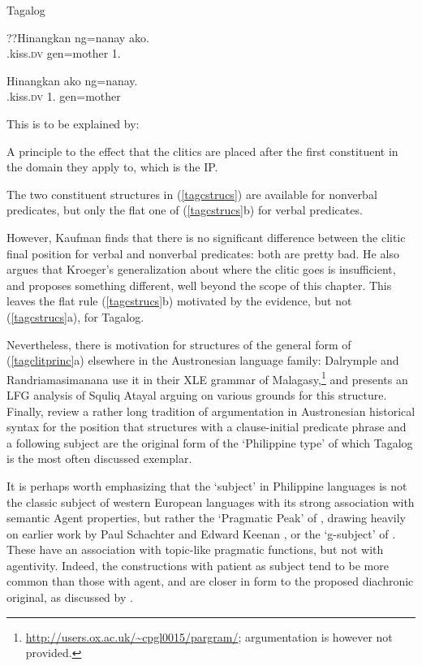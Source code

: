 \documentclass[output=paper,hidelinks]{langscibook}
\begin{document}
\newpage
\ea Tagalog
\begin{xlist}
\item
??\gll Hinangkan ng=nanay ako.\\
\PRF.kiss.\textsc{dv} {\sc gen}=mother 1\SG.\NOM\\
\item
\gll Hinangkan ako ng=nanay.\\
\PRF.kiss.\textsc{dv} {1\SG.\NOM} {\sc gen}=mother\\
\end{xlist}
\z
This is to be explained by:
\ea\label{tagclitprinc}
\begin{xlist}
\item A principle to the effect that the clitics are placed after the first
constituent in the domain they apply to, which is the IP.
\item The two constituent structures in (\ref{tagcstrucs}) are available for nonverbal
predicates, but only the flat one of (\ref{tagcstrucs}b) for verbal predicates.
\end{xlist}
\z
However, Kaufman finds that there is no significant difference between the clitic final
position for verbal and nonverbal predicates: both are pretty bad.  He also argues
that Kroeger's generalization about where the clitic goes is insufficient, and proposes
something different, well beyond the scope of this chapter.  This leaves the
flat rule (\ref{tagcstrucs}b) motivated by the evidence, but not (\ref{tagcstrucs}a), for Tagalog.

Nevertheless, there is motivation for structures of the general form of (\ref{tagclitprinc}a) elsewhere
in the Austronesian language family: Dalrymple and Randriamasimanana use it in
their XLE grammar of Malagasy,\footnote
  {\url{http://users.ox.ac.uk/~cpgl0015/pargram/}; argumentation is however not
  provided.}
and \citet{LiuKL2017} presents an LFG analysis of Squliq Atayal arguing on various
grounds for this structure.  Finally, \citet{KaufmanChen2017}
review a rather long tradition of argumentation in Austronesian historical syntax
for the position that structures with a clause-initial predicate phrase and a following
subject are the original form of the `Philippine type' of which Tagalog is the most
often discussed exemplar.

It is perhaps worth emphasizing that the `subject' in Philippine languages
is not the classic subject of western European languages with its strong association
with semantic Agent properties, but rather the `Pragmatic Peak' of
\citet{FoleyVanValin1984}, drawing heavily on earlier work by Paul Schachter and Edward
Keenan \citep{keenan76,Schachter1977}, or the `g-subject' of \citet{Manning1996}.
These have an association with topic-like pragmatic functions, but not with agentivity.
Indeed, the constructions with patient as subject tend to be more common than those
with agent, and are closer in form to the proposed diachronic original, as discussed
by \citet{KaufmanChen2017}.
\end{document}
